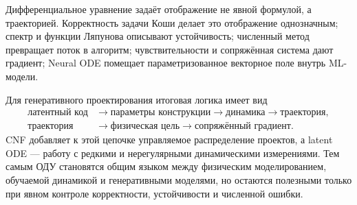 Дифференциальное уравнение задаёт отображение не явной формулой, а траекторией. Корректность задачи Коши делает это отображение однозначным; спектр и функции Ляпунова описывают устойчивость; численный метод превращает поток в алгоритм; чувствительности и сопряжённая система дают градиент; Neural ODE помещает параметризованное векторное поле внутрь ML-модели.

Для генеративного проектирования итоговая логика имеет вид
\[
\begin{aligned}
\text{латентный код}
&\longrightarrow
\text{параметры конструкции}
\longrightarrow
\text{динамика}
\longrightarrow
\text{траектория},\\
\text{траектория}
&\longrightarrow
\text{физическая цель}
\longrightarrow
\text{сопряжённый градиент}.
\end{aligned}
\]
CNF добавляет к этой цепочке управляемое распределение проектов, а latent ODE --- работу с редкими и нерегулярными динамическими измерениями. Тем самым ОДУ становятся общим языком между физическим моделированием, обучаемой динамикой и генеративными моделями, но остаются полезными только при явном контроле корректности, устойчивости и численной ошибки.
